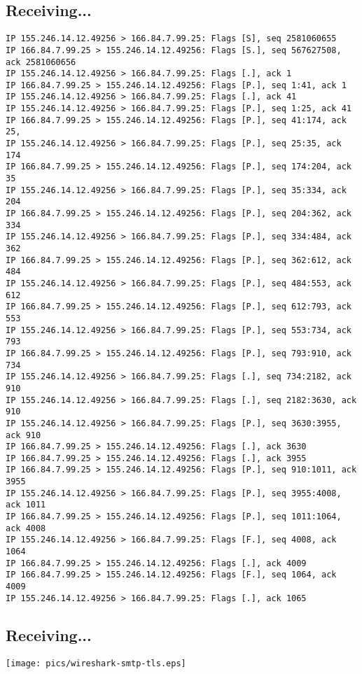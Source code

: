 \documentclass[xga]{xdvislides}
\begin{document}
\subsection{Receiving...}
\small
\begin{verbatim}
IP 155.246.14.12.49256 > 166.84.7.99.25: Flags [S], seq 2581060655
IP 166.84.7.99.25 > 155.246.14.12.49256: Flags [S.], seq 567627508, ack 2581060656
IP 155.246.14.12.49256 > 166.84.7.99.25: Flags [.], ack 1
IP 166.84.7.99.25 > 155.246.14.12.49256: Flags [P.], seq 1:41, ack 1
IP 155.246.14.12.49256 > 166.84.7.99.25: Flags [.], ack 41
IP 155.246.14.12.49256 > 166.84.7.99.25: Flags [P.], seq 1:25, ack 41
IP 166.84.7.99.25 > 155.246.14.12.49256: Flags [P.], seq 41:174, ack 25,
IP 155.246.14.12.49256 > 166.84.7.99.25: Flags [P.], seq 25:35, ack 174
IP 166.84.7.99.25 > 155.246.14.12.49256: Flags [P.], seq 174:204, ack 35
IP 155.246.14.12.49256 > 166.84.7.99.25: Flags [P.], seq 35:334, ack 204
IP 166.84.7.99.25 > 155.246.14.12.49256: Flags [P.], seq 204:362, ack 334
IP 155.246.14.12.49256 > 166.84.7.99.25: Flags [P.], seq 334:484, ack 362
IP 166.84.7.99.25 > 155.246.14.12.49256: Flags [P.], seq 362:612, ack 484
IP 155.246.14.12.49256 > 166.84.7.99.25: Flags [P.], seq 484:553, ack 612
IP 166.84.7.99.25 > 155.246.14.12.49256: Flags [P.], seq 612:793, ack 553
IP 155.246.14.12.49256 > 166.84.7.99.25: Flags [P.], seq 553:734, ack 793
IP 166.84.7.99.25 > 155.246.14.12.49256: Flags [P.], seq 793:910, ack 734
IP 155.246.14.12.49256 > 166.84.7.99.25: Flags [.], seq 734:2182, ack 910
IP 155.246.14.12.49256 > 166.84.7.99.25: Flags [.], seq 2182:3630, ack 910
IP 155.246.14.12.49256 > 166.84.7.99.25: Flags [P.], seq 3630:3955, ack 910
IP 166.84.7.99.25 > 155.246.14.12.49256: Flags [.], ack 3630
IP 166.84.7.99.25 > 155.246.14.12.49256: Flags [.], ack 3955
IP 166.84.7.99.25 > 155.246.14.12.49256: Flags [P.], seq 910:1011, ack 3955
IP 155.246.14.12.49256 > 166.84.7.99.25: Flags [P.], seq 3955:4008, ack 1011
IP 166.84.7.99.25 > 155.246.14.12.49256: Flags [P.], seq 1011:1064, ack 4008
IP 155.246.14.12.49256 > 166.84.7.99.25: Flags [F.], seq 4008, ack 1064
IP 166.84.7.99.25 > 155.246.14.12.49256: Flags [.], ack 4009
IP 166.84.7.99.25 > 155.246.14.12.49256: Flags [F.], seq 1064, ack 4009
IP 155.246.14.12.49256 > 166.84.7.99.25: Flags [.], ack 1065
\end{verbatim}
\Normalsize

\subsection{Receiving...}
\begin{center}
	\texttt{[image: pics/wireshark-smtp-tls.eps]}
\end{center}
\end{document}
